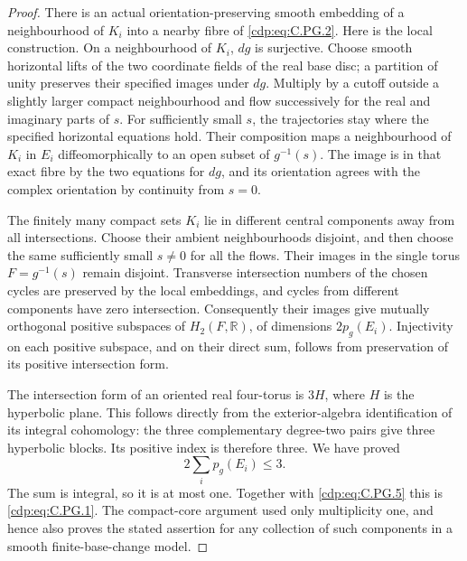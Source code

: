 \begin{proof}
There is an actual orientation-preserving
smooth embedding of a neighbourhood of
$K_i$ into a nearby fibre of \eqref{cdp:eq:C.PG.2}.
Here is the local construction. On a
neighbourhood of $K_i$, $dg$ is surjective.
Choose smooth horizontal lifts of the two
coordinate fields of the real base disc;
a partition of unity preserves their
specified images under $dg$. Multiply by
a cutoff outside a slightly larger compact
neighbourhood and flow successively for
the real and imaginary parts of $s$.
For sufficiently small $s$, the trajectories
stay where the specified horizontal equations
hold. Their composition maps a neighbourhood
of $K_i$ in $E_i$ diffeomorphically to an
open subset of $g^{-1}(s)$. The image is
in that exact fibre by the two equations
for $dg$, and its orientation agrees with
the complex orientation by continuity
from $s=0$.

The finitely many compact sets $K_i$ lie
in different central components away
from all intersections. Choose their
ambient neighbourhoods disjoint, and
then choose the same sufficiently small
$s\ne0$ for all the flows. Their images
in the single torus $F=g^{-1}(s)$ remain
disjoint. Transverse intersection numbers
of the chosen cycles are preserved by
the local embeddings, and cycles from
different components have zero intersection.
Consequently their images give mutually
orthogonal positive subspaces of
$H_2(F,\mathbb R)$, of dimensions
$2p_g(E_i)$. Injectivity on each positive
subspace, and on their direct sum,
follows from preservation of its positive
intersection form.

The intersection form of an oriented
real four-torus is $3H$, where $H$ is
the hyperbolic plane. This follows
directly from the exterior-algebra
identification of its integral
cohomology: the three complementary
degree-two pairs give three hyperbolic
blocks. Its positive index is therefore
three. We have proved
\[
                    2\sum_i p_g(E_i)\le3.
                                                               \tag{C.PG.9}\label{cdp:eq:C.PG.9}
\]
The sum is integral, so it is at most
one. Together with \eqref{cdp:eq:C.PG.5} this is
\eqref{cdp:eq:C.PG.1}. The compact-core argument
used only multiplicity one, and hence
also proves the stated assertion for
any collection of such components in
a smooth finite-base-change model.
\end{proof}


